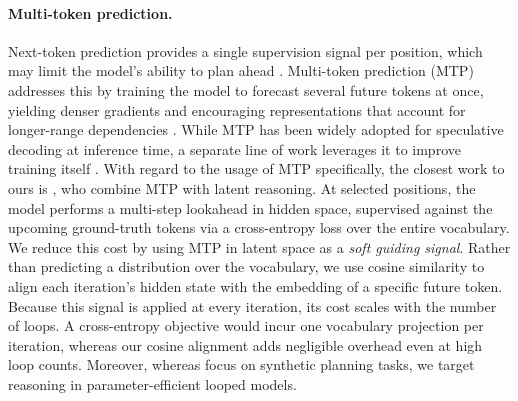 \paragraph{Multi-token prediction.} Next-token prediction provides a single supervision signal per position, which may limit the model's ability to plan ahead \citep{cornille2024learning}. 
Multi-token prediction (MTP) addresses this by training the model to forecast several future tokens at once, yielding denser gradients and encouraging representations that account for longer-range dependencies \citep{liu2024deepseek}.
While MTP has been widely adopted for speculative decoding at inference time, a separate line of work leverages it to improve training itself \citep{gloeckle2024better, liu2024deepseek}. 
With regard to the usage of MTP specifically, the closest work to ours is \citet{noci2026thinking}, who combine MTP with latent reasoning. At selected positions, the model performs a multi-step lookahead in hidden space, supervised against the upcoming ground-truth tokens via a cross-entropy loss over the entire vocabulary.
We reduce this cost by using MTP in latent space as a \textit{soft guiding signal}. 
Rather than predicting a distribution over the vocabulary, we use cosine similarity to align each iteration's hidden state with the embedding of a specific future token. 
Because this signal is applied at every iteration, its cost scales with the number of loops. 
A cross-entropy objective would incur one vocabulary projection per iteration, whereas our cosine alignment adds negligible overhead even at high loop counts. 
Moreover, whereas \citet{noci2026thinking} focus on synthetic planning tasks, we target reasoning in parameter-efficient looped models.
